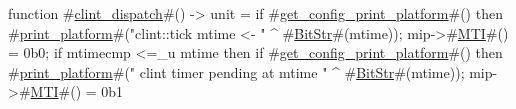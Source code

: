 function #\hyperref[sailRISCVzclintzydispatch]{clint\_dispatch}#() -> unit = {
  if   #\hyperref[sailRISCVzgetzyconfigzyprintzyplatform]{get\_config\_print\_platform}#()
  then #\hyperref[sailRISCVzprintzyplatform]{print\_platform}#("clint::tick mtime <- " ^ #\hyperref[sailRISCVzBitStr]{BitStr}#(mtime));
  mip->#\hyperref[sailRISCVzMTI]{MTI}#() = 0b0;
  if mtimecmp <=_u mtime then {
    if   #\hyperref[sailRISCVzgetzyconfigzyprintzyplatform]{get\_config\_print\_platform}#()
    then #\hyperref[sailRISCVzprintzyplatform]{print\_platform}#(" clint timer pending at mtime " ^ #\hyperref[sailRISCVzBitStr]{BitStr}#(mtime));
    mip->#\hyperref[sailRISCVzMTI]{MTI}#() = 0b1
  }
}
